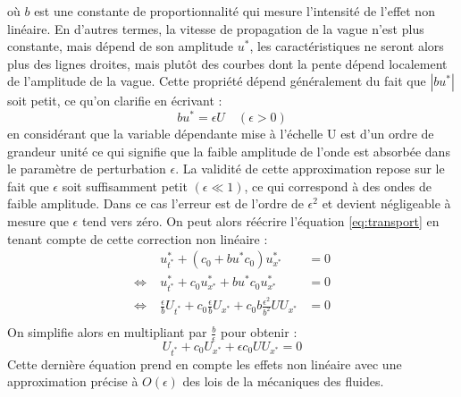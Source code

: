 où $b$ est une constante de proportionnalité qui mesure l'intensité de l'effet non linéaire. En d'autres termes, la vitesse de propagation de la vague n'est plus constante, mais dépend de son amplitude $u^*$, les caractéristiques ne seront alors plus des lignes droites, mais plutôt des courbes dont la pente dépend localement de l'amplitude de la vague. Cette propriété dépend généralement du fait que $|bu^*|$ soit petit, ce qu'on clarifie en écrivant :
\begin{equation}
    bu^* = \epsilon U \quad (\epsilon > 0)
\end{equation}
en considérant que la variable dépendante mise à l'échelle U est d'un ordre de grandeur unité ce qui signifie que la faible amplitude de l'onde est absorbée dans le paramètre de perturbation $\epsilon$. La validité de cette approximation repose sur le fait que $\epsilon$ soit suffisamment petit $(\epsilon \ll 1)$, ce qui correspond à des ondes de faible amplitude. Dans ce cas l'erreur est de l'ordre de $\epsilon^2$ et devient négligeable à mesure que $\epsilon$ tend vers zéro. On peut alors réécrire l'équation \ref{eq:transport} en tenant compte de cette correction non linéaire :
\begin{align*}
    &u^*_{t^*} + (c_0 + b u^* c_0) u^*_{x^*} &= 0 \\
    \Leftrightarrow \; &u^*_{t^*} + c_0 u^*_{x^*} + b u^* c_0 u^*_{x^*} &= 0 \\
    \Leftrightarrow \; &\frac{\epsilon}{b} U_{t^*} + c_0 \frac{\epsilon}{b} U_{x^*} + c_0 b \frac{\epsilon^2}{b^2} U U_{x^*} &= 0 \\
\end{align*}
On simplifie alors en multipliant par $\frac{b}{\epsilon}$ pour obtenir :
\begin{equation}
    U_{t^*} + c_0 U_{x^*} + \epsilon c_0 U U_{x^*} = 0
\end{equation}
Cette dernière équation prend en compte les effets non linéaire avec une approximation précise à $O(\epsilon)$ des lois de la mécaniques des fluides.

